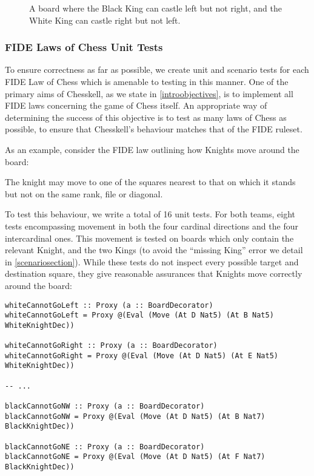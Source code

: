 \begin{figure}[h]
    \centering
    \showboard
    \caption{A board where the Black King can castle left but not right, and the White King can castle right but not left.}
    \label{castleboard}
\end{figure}

\subsubsection{FIDE Laws of Chess Unit Tests}

To ensure correctness as far as possible, we create unit and scenario tests for each FIDE Law of Chess which is amenable to testing in this manner. One of the primary aims of Chesskell, as we state in \cref{introobjectives}, is to implement all FIDE laws concerning the game of Chess itself. An appropriate way of determining the success of this objective is to test as many laws of Chess as possible, to ensure that Chesskell's behaviour matches that of the FIDE ruleset.

As an example, consider the FIDE law outlining how Knights move around the board:

\begin{quoting}
    The knight may move to one of the squares nearest to that on which it stands but not on the same rank, file or diagonal.
\end{quoting}

To test this behaviour, we write a total of 16 unit tests. For both teams, eight tests encompassing movement in both the four cardinal directions and the four intercardinal ones. This movement is tested on boards which only contain the relevant Knight, and the two Kings (to avoid the ``missing King'' error we detail in \cref{scenariosection}). While these tests do not inspect every possible target and destination square, they give reasonable assurances that Knights move correctly around the board:

\begin{lstlisting}
whiteCannotGoLeft :: Proxy (a :: BoardDecorator)
whiteCannotGoLeft = Proxy @(Eval (Move (At D Nat5) (At B Nat5) WhiteKnightDec))

whiteCannotGoRight :: Proxy (a :: BoardDecorator)
whiteCannotGoRight = Proxy @(Eval (Move (At D Nat5) (At E Nat5) WhiteKnightDec))

-- ...

blackCannotGoNW :: Proxy (a :: BoardDecorator)
blackCannotGoNW = Proxy @(Eval (Move (At D Nat5) (At B Nat7) BlackKnightDec))

blackCannotGoNE :: Proxy (a :: BoardDecorator)
blackCannotGoNE = Proxy @(Eval (Move (At D Nat5) (At F Nat7) BlackKnightDec))
\end{lstlisting}

